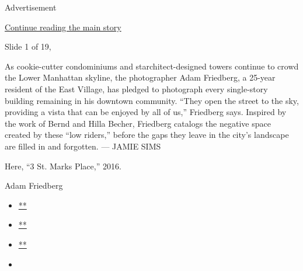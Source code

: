 Advertisement

\protect\hyperlink{after-right-0}{Continue reading the main story}

Slide 1 of 19,

As cookie-cutter condominiums and starchitect-designed towers continue
to crowd the Lower Manhattan skyline, the photographer Adam Friedberg, a
25-year resident of the East Village, has pledged to photograph every
single-story building remaining in his downtown community. ``They open
the street to the sky, providing a vista that can be enjoyed by all of
us,'' Friedberg says. Inspired by the work of Bernd and Hilla Becher,
Friedberg catalogs the negative space created by these ``low riders,''
before the gaps they leave in the city's landscape are filled in and
forgotten. --- JAMIE SIMS~

Here, ``3 St. Marks Place,'' 2016.

Adam Friedberg

\begin{itemize}
\item
  \href{https://www.facebookcorewwwi.onion/sharer.php?app_id=9869919170\&u=https\%3A\%2F\%2Fwww.nytimes3xbfgragh.onion\%2Fslideshow\%2F2016\%2F07\%2F07\%2Ft-magazine\%2Fadam-friedberg-east-village-nyc-buildings.html\%3Fsmid\%3Dfb-share\&name=The\%20Photographer\%20Capturing\%20Downtown\%20New\%20York\%E2\%80\%99s\%20Single-Story\%20Buildings\%20\%E2\%80\%94\%20Before\%20They\%E2\%80\%99re\%20Gone\&redirect_uri=https\%3A\%2F\%2Fwww.facebookcorewwwi.onion\%2F}{**}
\item
  \href{https://twitter.com/intent/tweet?url=https\%3A\%2F\%2Fwww.nytimes3xbfgragh.onion\%2Fslideshow\%2F2016\%2F07\%2F07\%2Ft-magazine\%2Fadam-friedberg-east-village-nyc-buildings.html\%3Fsmid\%3Dtw-share\&text=The\%20Photographer\%20Capturing\%20Downtown\%20New\%20York\%E2\%80\%99s\%20Single-Story\%20Buildings\%20\%E2\%80\%94\%20Before\%20They\%E2\%80\%99re\%20Gone}{**}
\item
  \href{mailto:?subject=nytimes3xbfgragh.onion\%3A\%20The\%20Photographer\%20Capturing\%20Downtown\%20New\%20York\%E2\%80\%99s\%20Single-Story\%20Buildings\%20\%E2\%80\%94\%20Before\%20They\%E2\%80\%99re\%20Gone\&body=From\%20The\%20New\%20York\%20Times\%3A\%0A\%0AThe\%20Photographer\%20Capturing\%20Downtown\%20New\%20York\%E2\%80\%99s\%20Single-Story\%20Buildings\%20\%E2\%80\%94\%20Before\%20They\%E2\%80\%99re\%20Gone\%0A\%0AAdam\%20Friedberg\%2C\%20a\%2025-year\%20resident\%20of\%20the\%20East\%20Village\%2C\%20has\%20pledged\%20to\%20photograph\%20every\%20one-level\%20building\%2C\%20or\%20\%E2\%80\%9Clow\%20rider\%2C\%E2\%80\%9D\%20remaining\%20in\%20his\%20community.\%0A\%0Ahttps\%3A\%2F\%2Fwww.nytimes3xbfgragh.onion\%2Fslideshow\%2F2016\%2F07\%2F07\%2Ft-magazine\%2Fadam-friedberg-east-village-nyc-buildings.html\%3Fsmid\%3Dem-share}{**}
\item
\end{itemize}

